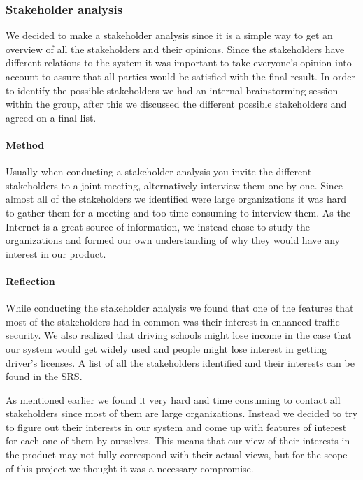 \documentclass[10pt]{article}
\begin{document}
\subsubsection{Stakeholder analysis}
We decided to make a stakeholder analysis since it is a simple way to get an overview of all the stakeholders and their opinions. Since the stakeholders have different relations to the system it was important to take everyone's opinion into account to assure that all parties would be satisfied with the final result. In order to identify the possible stakeholders we had an internal brainstorming session within the group, after this we discussed the different possible stakeholders and agreed on a final list.

\paragraph{Method}
\hfill \break
Usually when conducting a stakeholder analysis you invite the different stakeholders to a joint meeting, alternatively interview them one by one. Since almost all of the stakeholders we identified were large organizations it was hard to gather them for a meeting and too time consuming to interview them. As the Internet is a great source of information, we instead chose to study the organizations and formed our own understanding of why they would have any interest in our product. 

\paragraph{Reflection}
\hfill \break
While conducting the stakeholder analysis we found that one of the features that most of the stakeholders had in common was their interest in enhanced traffic-security. We also realized that driving schools might lose income in the case that our system would get widely used and people might lose interest in getting driver's licenses. A list of all the stakeholders identified and their interests can be found in the SRS\cite{srs}. 

\noindent As mentioned earlier we found it very hard and time consuming to contact all stakeholders since most of them are large organizations. Instead we decided to try to figure out their interests in our system and come up with features of interest for each one of them by ourselves. This means that our view of their interests in the product may not fully correspond with their actual views, but for the scope of this project we thought it was a necessary compromise.
\end{document}
